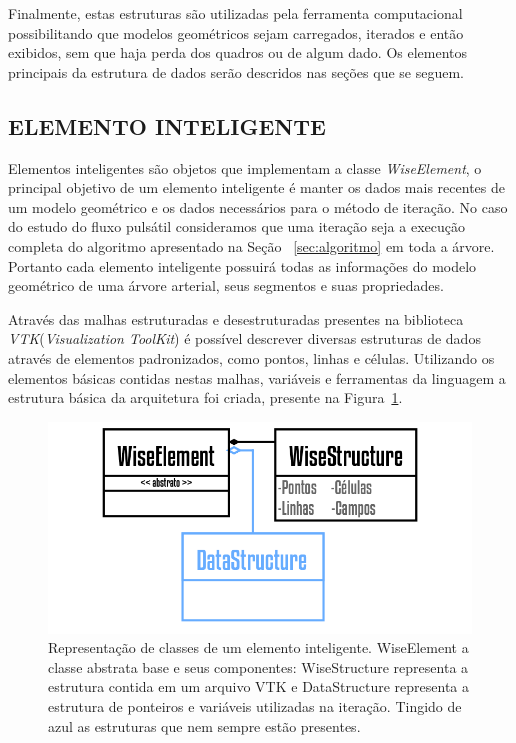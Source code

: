 \documentclass[a4paper,12pt]{monografia}
\theoremstyle{plain}
\theoremstyle{definition}
\theoremstyle{remark}
\begin{document}
Finalmente, estas estruturas são utilizadas pela ferramenta computacional possibilitando que modelos geométricos sejam carregados, iterados e então exibidos, sem que haja perda dos quadros ou de algum dado. Os elementos principais da estrutura de dados serão descridos nas seções que se seguem.

\subsection{ELEMENTO INTELIGENTE}\label{sec:elemento_inteligente}

Elementos inteligentes são objetos que implementam a classe \textit{WiseElement}, o principal objetivo de um elemento inteligente é manter os dados mais recentes de um modelo geométrico e os dados necessários para o método de iteração. No caso do estudo do fluxo pulsátil consideramos que uma iteração seja a execução completa do algoritmo apresentado na Seção~ \ref{sec:algoritmo} em toda a árvore. Portanto cada elemento inteligente possuirá todas as informações do modelo geométrico de uma árvore arterial, seus segmentos e suas propriedades.

Através das malhas estruturadas e desestruturadas presentes na biblioteca \textit{VTK}(\textit{Visualization ToolKit}) é possível descrever diversas estruturas de dados através de elementos padronizados, como pontos, linhas e células. Utilizando os elementos básicas contidas nestas malhas, variáveis e ferramentas da linguagem a estrutura básica da arquitetura foi criada, presente na Figura~\ref{fig2:wiselement}.

\begin{figure}[!htbp]
	\centering
	\includegraphics[scale=1]{Figures/WiseElement.png}
	\caption{Representação de classes de um elemento inteligente. WiseElement a classe abstrata base e seus componentes: WiseStructure representa a estrutura contida em um arquivo VTK e DataStructure representa a estrutura de ponteiros e variáveis utilizadas na iteração. Tingido de azul as estruturas que nem sempre estão presentes.}
	\label{fig2:wiselement}
\end{figure}
\end{document}
